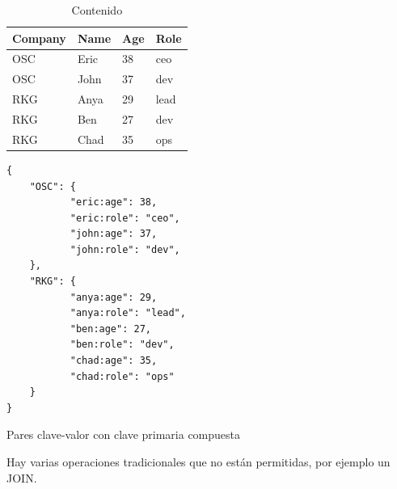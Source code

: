 \documentclass[11pt,a4paper]{article}
\begin{document}
\begin{table}[h]
\centering
\caption{Contenido}
\label{my-label}
\begin{tabular}{|l|l|l|l|}
\hline
Company & Name & Age & Role \\ \hline
OSC     & Eric & 38  & ceo  \\ \hline
OSC     & John & 37  & dev  \\ \hline
RKG     & Anya & 29  & lead \\ \hline
RKG     & Ben  & 27  & dev  \\ \hline
RKG     & Chad & 35  & ops  \\ \hline
\end{tabular}
\end{table}

\begin{listing}
\begin{verbatim}
{
	"OSC": {
           "eric:age": 38,
		   "eric:role": "ceo",
		   "john:age": 37,
		   "john:role": "dev",
    },
    "RKG": {
           "anya:age": 29,
		   "anya:role": "lead",
		   "ben:age": 27,
		   "ben:role": "dev",
		   "chad:age": 35,
		   "chad:role": "ops"
    }
}
\end{verbatim}
\caption{Pares clave-valor con clave primaria compuesta} 
\label{json-example}
\end{listing}

Hay varias operaciones tradicionales que no están permitidas, por ejemplo un JOIN.
\end{document}
